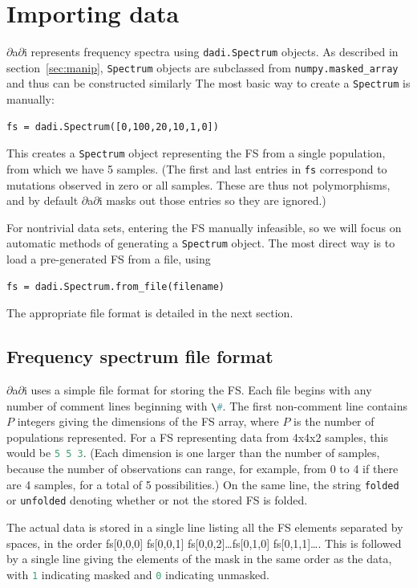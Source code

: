 \documentclass[12pt]{article}
\makeatletter
\newcommand{\dadi}{$\partial$a$\partial$i\xspace}
\newcommand{\py}[1]{\lstinline[language=Python, showstringspaces=False]@#1@}
\makeatother
\begin{document}
\section{Importing data}

\dadi represents frequency spectra using \py{dadi.Spectrum} objects.
As described in section~\ref{sec:manip}, \py{Spectrum} objects are subclassed from \py{numpy.masked_array} and thus can be constructed similarly
The most basic way to create a \py{Spectrum} is manually:
\begin{lstlisting}
fs = dadi.Spectrum([0,100,20,10,1,0])
\end{lstlisting}
This creates a \py{Spectrum} object representing the FS from a single population, from which we have 5 samples.
(The first and last entries in \py{fs} correspond to mutations observed in zero or all samples. These are thus not polymorphisms, and by default \dadi masks out those entries so they are ignored.)

For nontrivial data sets, entering the FS manually infeasible, so we will focus on automatic methods of generating a \py{Spectrum} object.
The most direct way is to load a pre-generated FS from a file, using
\begin{lstlisting}
fs = dadi.Spectrum.from_file(filename)
\end{lstlisting}
The appropriate file format is detailed in the next section.

\subsection{Frequency spectrum file format}

\dadi uses a simple file format for storing the FS.
Each file begins with any number of comment lines beginning with \py{\#}.
The first non-comment line contains $P$ integers giving the dimensions of the FS array, where $P$ is the number of populations represented.
For a FS representing data from 4x4x2 samples, this would be \py{5 5 3}.
(Each dimension is one larger than the number of samples, because the number of observations can range, for example, from 0 to 4 if there are 4 samples, for a total of 5 possibilities.)
On the same line, the string \py{folded} or \py{unfolded} denoting whether or not the stored FS is folded.

The actual data is stored in a single line listing all the FS elements separated by spaces, in the order fs[0,0,0] fs[0,0,1] fs[0,0,2]\dots fs[0,1,0] fs[0,1,1]\dots.
This is followed by a single line giving the elements of the mask in the same order as the data, with \py{1} indicating masked and \py{0} indicating unmasked.
\end{document}
